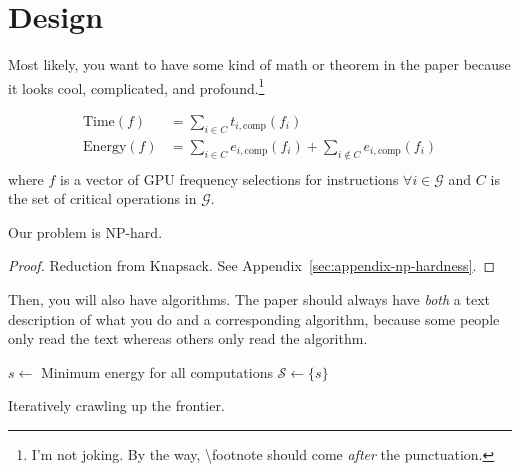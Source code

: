 \section{Design}\label{sec:design}

Most likely, you want to have some kind of math or theorem in the paper because it looks cool, complicated, and profound.\footnote{I'm not joking. By the way, \textbackslash{}footnote should come \emph{after} the punctuation.}

\begin{equation}
  \label{eq:design-optimization}
  \begin{aligned}
    \textrm{Time}(f)   & = \sum_{i \in C}{t_{i,\textrm{comp}}(f_i)} \\
    \textrm{Energy}(f) & = \sum_{i \in C}{e_{i,\textrm{comp}}(f_i)} + \sum_{i \notin C}{e_{i,\textrm{comp}}(f_i)} \\
  \end{aligned}
\end{equation}
where $f$ is a vector of GPU frequency selections for instructions $\forall i \in \mathcal{G}$ and $C$ is the set of critical operations in $\mathcal{G}$.

\begin{theorem}
  Our problem is NP-hard.
\end{theorem}
\begin{proof}
  Reduction from Knapsack. See Appendix~\ref{sec:appendix-np-hardness}.
\end{proof}

Then, you will also have algorithms.
The paper should always have \emph{both} a text description of what you do and a corresponding algorithm, because some people only read the text whereas others only read the algorithm.

\begin{algorithm}[t]
  \algrule{}


  \algrule{}

  $s \leftarrow$ Minimum energy for all computations\;\label{algoline:design-min-energy-plan}
  $\mathcal{S} \leftarrow \{ s \}$\;



  \algrule{}

  \caption{Iteratively crawling up the frontier.}\label{algo:design-overview}
\end{algorithm}

